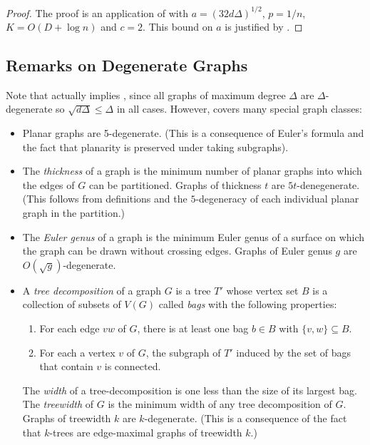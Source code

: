 \documentclass{patmorin}
\begin{document}
\begin{proof}
  The proof is an application of  with
  $a=(32d\Delta)^{1/2}$, $p=1/n$, $K=O(D+\log n)$ and $c=2$. This bound
  on $a$ is justified by .
\end{proof}


\subsection{Remarks on Degenerate Graphs}

Note that  actually implies
, since all graphs of maximum degree $\Delta$
are $\Delta$-degenerate so $\sqrt{d\Delta}\le \Delta$ in all cases.
However,  covers many special
graph classes:

\begin{itemize}
  \item Planar graphs are 5-degenerate. (This is a consequence of Euler's
    formula and the fact that planarity is preserved under taking subgraphs).
  
  \item The \emph{thickness} of a graph is the minimum number of planar
    graphs into which the edges of $G$ can be partitioned. Graphs of
    thickness $t$ are $5t$-denegenerate.  (This follows from definitions
    and the $5$-degeneracy of each individual planar graph in the
    partition.)

  \item The \emph{Euler genus} of a graph is the minimum Euler genus of
    a surface on which the graph can be drawn without crossing edges.  Graphs of
    Euler genus $g$ are $O(\sqrt{g})$-degenerate.

  \item A \emph{tree decomposition} of a graph $G$ is a tree $T'$ whose
  vertex set $B$ is a collection of subsets of $V(G)$ called \emph{bags}
  with the following properties:
  \begin{enumerate}
    \item For each edge $vw$ of $G$, there is at least one bag $b\in B$
      with $\{v,w\}\subseteq B$.
    \item For each a vertex $v$ of $G$, the subgraph of $T'$ induced by
      the set of bags that contain $v$ is connected.
  \end{enumerate}
  The \emph{width} of a tree-decomposition is one less than the size
  of its largest bag.  The \emph{treewidth} of $G$ is the minimum
  width of any tree decomposition of $G$.
  Graphs of treewidth $k$ are $k$-degenerate. (This is a consequence
  of the fact that $k$-trees are edge-maximal graphs of treewidth $k$.)
\end{itemize} 
\end{document}

